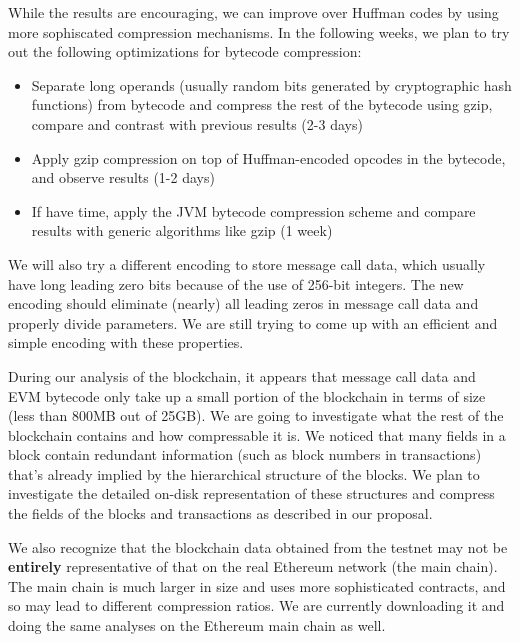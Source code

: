 \documentclass[12pt]{article}
\begin{document}
While the results are encouraging, we can improve over Huffman codes by using more sophiscated compression mechanisms.
In the following weeks, we plan to try out the following optimizations for bytecode compression:

\begin{itemize}
\item Separate long operands (usually random bits generated by cryptographic hash functions) from bytecode and
        compress the rest of the bytecode using gzip, compare and contrast with previous results (2-3 days)
\item Apply gzip compression on top of Huffman-encoded opcodes in the bytecode, and observe results (1-2 days)
\item If have time, apply the JVM bytecode compression scheme and compare results with generic algorithms like gzip (1 week)
\end{itemize}

We will also try a different encoding to store message call data, which usually have long leading zero bits because of the use
of 256-bit integers. The new encoding should eliminate (nearly) all leading zeros in message call data and properly divide parameters.
We are still trying to come up with an efficient and simple encoding with these properties.

During our analysis of the blockchain, it appears that message call data and EVM bytecode only take up a small portion of the blockchain
in terms of size (less than 800MB out of 25GB). We are going to investigate what the rest of the blockchain contains and how compressable
it is. We noticed that many fields in a block contain redundant information (such as block numbers in transactions) that's already implied
by the hierarchical structure of the blocks. We plan to investigate the detailed on-disk representation of these structures and compress
the fields of the blocks and transactions as described in our proposal.

We also recognize that the blockchain data obtained from the testnet may not be \textbf{entirely} representative of that on the real Ethereum network
(the main chain). The main chain is much larger in size and uses more sophisticated contracts, and so may lead to different compression ratios.
We are currently downloading it and doing the same analyses on the Ethereum main chain as well.
\end{document}
